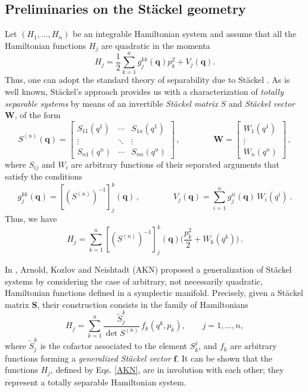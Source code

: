 \documentclass[10pt]{amsart}
\numberwithin{equation}{section}
\newcommand{\bs}{\boldsymbol}
\theoremstyle{definition}
\begin{document}
	\subsection{Preliminaries on the St\"ackel geometry}\label{sec:3.2}
	Let $(H_1,\ldots, H_n)$ be an integrable Hamiltonian system and assume that all the Hamiltonian functions $H_j$ are quadratic in the momenta 
	\begin{equation} \label{}
		H_j=\frac{1}{2} \sum_{k=1}^n g_{j}^{kk}(\boldsymbol{q}) p_k^2 +V_j(\boldsymbol{q}).
	\end{equation}
	Thus, one can adopt the standard theory of separability due to St\"ackel \cite{St1893CRAS,Pere}. As is well known, St\"ackel's approach provides us with a characterization of \textit{totally separable systems} by means of an invertible \textit{St\"ackel matrix} ${S}$ and \textit{St\"ackel vector} $\bs{W}$, of the form
	\begin{equation} \label{eq:SM}
		S^{(n)}(\bs{q})= 
		\begin{bmatrix}
			S_{11}(q^1)& \cdots & S_{1n}(q^1) \\ 
			\vdots &\ddots & \vdots \\
			S_{n1}(q^n) & \cdots & S_{nn}(q^n)
		\end{bmatrix} \, ,
		\qquad\qquad 
		\bs{W}= 
		\begin{bmatrix}
			W_{1}(q^1) \\ 
			\vdots \\
			W_{n}(q^n) 
		\end{bmatrix} \,,
	\end{equation} 
	where $S_{ij}$ and $W_{i}$ are arbitrary functions of their separated arguments that satisfy the conditions
	\begin{equation}\label{eq:stackel_data}
		g_{j}^{kk}(\boldsymbol{q})=[(S^{(n)})^{-1}]_{j}^{k}(\bs{q}) \, , \qquad\qquad V_{j}(\bs{q})=\sum_{i=1}^n g^{ii}_j(\boldsymbol{q})\, W_i(q^i) \ .
	\end{equation}
	Thus, we have
	\begin{equation} \label{eq:1.9}
		H_j=\sum_{k=1}^n [(S^{(n)})^{-1}]_{j}^{k}(\boldsymbol{q})\Big( \frac{p_k^2}{2} +W_{k}(q^k)\Big) \,.
	\end{equation}
	
	
	
	In \cite{AKN1997}, Arnold, Kozlov and Neishtadt (AKN) proposed a generalization of St\"ackel systems by considering the case of arbitrary, not necessarily quadratic, Hamiltonian functions defined in a symplectic manifold. Precisely, given a St\"ackel matrix $\bs{S}$, their construction consists in the family of Hamiltonians
	\begin{equation}
		H_{j} = \sum_{k=1}^{n} \dfrac{\tilde{S}_{j}^{k}}{\det S^{(n)}} \, f_{k}(q^k,p_k), \qquad j=1,\ldots, n,
		\label{AKN}
	\end{equation}
	where $\tilde{S}_{j}^{k}$ is the cofactor associated to the element $S_{k}^{j}$, and $f_{k}$ are arbitrary functions forming a \emph{generalized St\"ackel vector} $\boldsymbol{f}$. It can be shown that the functions $H_j$, defined by Eqs. \eqref{AKN}, are in involution with each other; they represent a totally separable Hamiltonian system.
	
\end{document}
